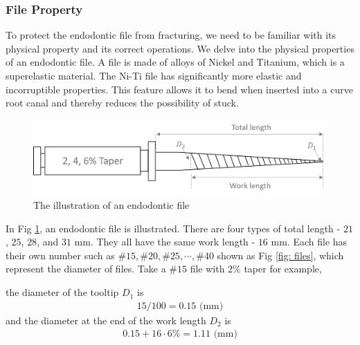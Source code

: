 \subsubsection{File Property}
\hspace*{6mm}To protect the endodontic file from fracturing, we need to be familiar with its physical property and its correct operations. We delve into the physical properties of an endodontic file. A file is made of alloys of Nickel and Titanium, which is a superelastic material. The Ni-Ti file has significantly more elastic and incorruptible properties. This feature allows it to bend when inserted into a curve root canal and thereby reduces the possibility of stuck.
\begin{figure}[htbp]
\begin{center}
\includegraphics[width=1\linewidth]{Images/Endodontic_File.png}
\caption{The illustration of an endodontic file
}\label{fig: Endodontic File}
\end{center}
\end{figure}	
\par
In Fig \ref{fig: Endodontic File}, an endodontic file is illustrated. There are four types of total length - $21$, $25$, $28$, and $31$ mm. They all have the same work length - $16$ mm. Each file has their own number such as $\#15, \#20, \#25, \cdots, \#40$ shown as Fig \ref{fig: files}, which represent the diameter of files. Take a $\#15$ file with $2\%$ taper for example,
\par\noindent
the diameter of the tooltip $D_1$ is
\begin{equation*}
\begin{split}
15/100=0.15 \text{ (mm)}
\end{split}
\end{equation*}
and the diameter at the end of the work length $D_2$ is
\begin{equation*}
\begin{split}
0.15 + 16 \cdot 6\% = 1.11 \text{ (mm)}
\end{split}
\end{equation*}
\par
